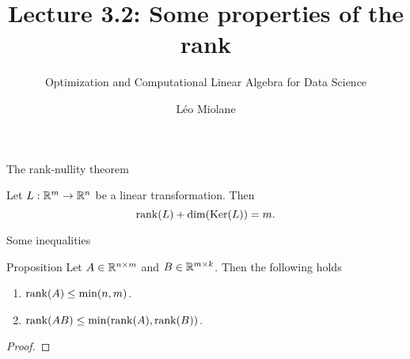 \documentclass{beamer}
\title{Lecture 3.2: Some properties of the rank}
\subtitle{Optimization and Computational Linear Algebra for Data Science}
\author{Léo Miolane}
\date{}
\begin{document}
\setcounter{showProgressBar}{0}
\setcounter{showSlideNumbers}{0}

\frame{\titlepage}



\setcounter{framenumber}{0}
\setcounter{showSlideNumbers}{1}

\begin{frame}[t]{The rank-nullity theorem}
	\begin{theorem}
		Let $L: \mathbb{R}^m \to \mathbb{R}^n$ be a linear transformation. Then
		$$
		{{\rm rank}}(L) + {{\rm dim}}({{\rm Ker}}(L)) = m.
		$$
	\end{theorem}
\end{frame}

\begin{frame}[t]{Some inequalities}
	\vspace{-0.5cm}
	\begin{block}{Proposition}
		Let $A \in \mathbb{R}^{n \times m}$ and $B \in \mathbb{R}^{m \times k}$. Then the following holds
		\begin{enumerate}
			\item ${{\rm rank}}(A) \leq \min(n,m)$.
			\item ${{\rm rank}}(AB) \leq \min({{\rm rank}}(A),{{\rm rank}}(B))$.
		\end{enumerate}
	\end{block}
	\vspace{-0.1cm}
	\begin{proof}
		\vfill
		\vspace{4.1cm}
	\end{proof}
	\pause
	\pause
\end{frame}
\end{document}
